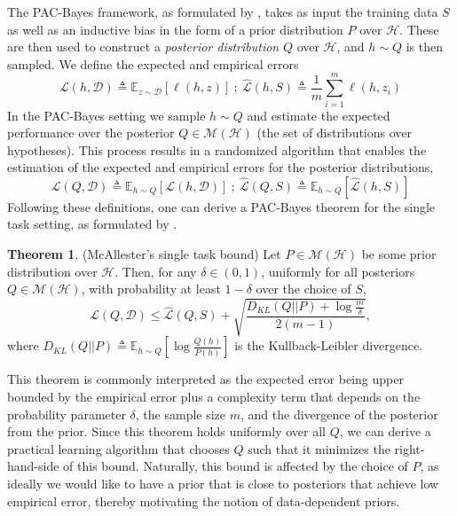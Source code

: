 \documentclass[letterpaper]{article} %
\theoremstyle{definition}
\newtheorem{theorem}{Theorem}[section]
\newcommand{\Expect}[2]{\mathbb{E}_{#1}\left [#2 \right ]}
\begin{document}
The PAC-Bayes framework, as formulated by \citet{Mcallester}, takes as input the training data $S$ as well as an inductive bias in the form of a prior distribution $P$ over $\mathcal{H}$. These are then used to construct a \emph{posterior distribution} $Q$ over $\mathcal{H}$, and $h\sim Q$ is then sampled. We define the expected and empirical errors
\begin{equation*}
    \mathcal{L}(h, \mathcal{D}) \triangleq \Expect{z\sim \mathcal{D}}{\ell(h,z)} ~;~ \hat{\mathcal{L}}(h, S)\triangleq \frac{1}{m}\sum_{i=1}^{m} \ell(h,z_i)
\end{equation*}
In the PAC-Bayes setting we sample $h\sim Q$ and estimate the expected performance over the posterior $Q\in \mathcal{M}(\mathcal{H})$ (the set of distributions over hypotheses). This process results in a randomized algorithm that enables the estimation of the expected and empirical errors for the posterior distributions, 
\begin{equation*}
    \mathcal{L}(Q, \mathcal{D}) \triangleq \Expect{h\sim Q}{\mathcal{L}(h, \mathcal{D})} ~;~ 
    \hat{\mathcal{L}}(Q, S) \triangleq \Expect{h\sim Q}{\hat{\mathcal{L}}(h, S)}
\end{equation*}
Following these definitions, one can derive a PAC-Bayes theorem for the single task setting, as formulated by \citet{Mcallester}. 
%
\begin{theorem} (McAllester's single task bound) \label{thm:classic-pb}
	Let $P\in \mathcal{M}(\mathcal{H})$ be some prior distribution over $\mathcal{H}$. Then, 
	for any $\delta \in (0,1)$, uniformly for all posteriors $Q\in \mathcal{M}(\mathcal{H})$, with probability at least $1-\delta$ over the choice of $S$, $$\mathcal{L}(Q, \mathcal{D}) \leq \hat{\mathcal{L}}(Q, S)+\sqrt{\frac{D_{KL}(Q||P)+\log\frac{m}{\delta}}{2(m-1)}}, $$
	where $D_{KL}(Q||P)\triangleq \Expect{h\sim Q}{\log\frac{Q(h)}{P(h)}}$ is the Kullback-Leibler divergence.
\end{theorem}
%
This theorem is commonly interpreted as the expected error being upper bounded by the empirical error plus a complexity term that depends on the probability parameter $\delta$, the sample size $m$, and the divergence of the posterior from the prior. Since this theorem holds uniformly over all $Q$, we can derive a practical learning algorithm that chooses $Q$ such that it minimizes the right-hand-side of this bound. Naturally, this bound is affected by the choice of $P$, as ideally we would like to have a prior that is close to posteriors that achieve low empirical error, thereby motivating the notion of data-dependent priors.
\end{document}
